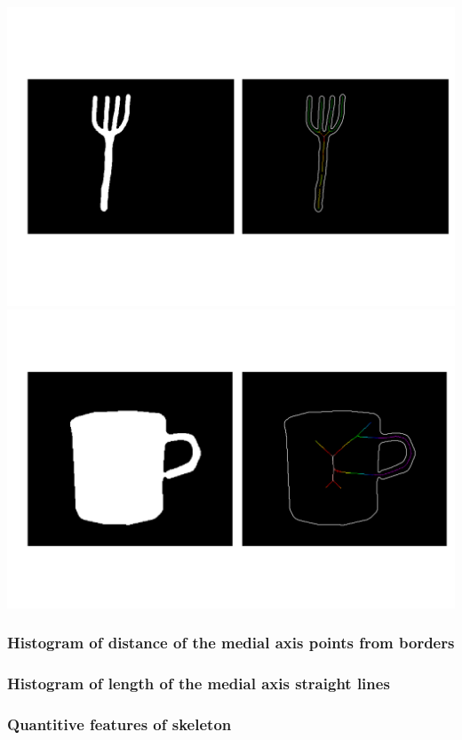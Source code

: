 \documentclass{article}
\begin{document}
\vspace{12px}

\includegraphics[scale=0.25]{fork_75.png}
\includegraphics[scale=0.25]{cup_476.png}


\subsubsection{Histogram of distance of the medial axis points from borders}
\subsubsection{Histogram of length of the medial axis straight lines}
\subsubsection{Quantitive features of skeleton}
\end{document}

